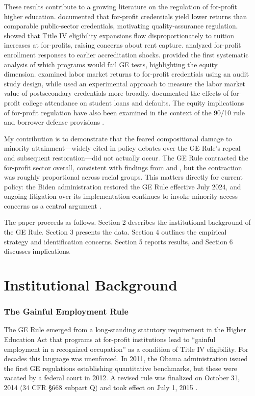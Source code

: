 \documentclass[12pt]{article}
\begin{document}
These results contribute to a growing literature on the regulation of for-profit higher education. \citet{DemingGoldinKatz2012} documented that for-profit credentials yield lower returns than comparable public-sector credentials, motivating quality-assurance regulation. \citet{CelliniTurner2019} showed that Title IV eligibility expansions flow disproportionately to tuition increases at for-profits, raising concerns about rent capture. \citet{Cellini2020} analyzed for-profit enrollment responses to earlier accreditation shocks. \citet{Kelchen2017} provided the first systematic analysis of which programs would fail GE tests, highlighting the equity dimension. \citet{Darolia2020} examined labor market returns to for-profit credentials using an audit study design, while \citet{DemingYusman2020} used an experimental approach to measure the labor market value of postsecondary credentials more broadly. \citet{ArcherHutchens2020} documented the effects of for-profit college attendance on student loans and defaults. The equity implications of for-profit regulation have also been examined in the context of the 90/10 rule \citep{CelliniKoester2023} and borrower defense provisions \citep{LooneyYannelis2022}.

My contribution is to demonstrate that the feared compositional damage to minority attainment---widely cited in policy debates over the GE Rule's repeal and subsequent restoration---did not actually occur. The GE Rule contracted the for-profit sector overall, consistent with findings from \citet{Kelchen2017} and \citet{BirdMacPhee2020}, but the contraction was roughly proportional across racial groups. This matters directly for current policy: the Biden administration restored the GE Rule effective July 2024, and ongoing litigation over its implementation continues to invoke minority-access concerns as a central argument \citep{TICAS2023}.

The paper proceeds as follows. Section 2 describes the institutional background of the GE Rule. Section 3 presents the data. Section 4 outlines the empirical strategy and identification concerns. Section 5 reports results, and Section 6 discusses implications.


\section{Institutional Background}

\subsubsection*{The Gainful Employment Rule} The GE Rule emerged from a long-standing statutory requirement in the Higher Education Act that programs at for-profit institutions lead to ``gainful employment in a recognized occupation'' as a condition of Title IV eligibility. For decades this language was unenforced. In 2011, the Obama administration issued the first GE regulations establishing quantitative benchmarks, but these were vacated by a federal court in 2012. A revised rule was finalized on October 31, 2014 (34 CFR \S668 subpart Q) and took effect on July 1, 2015 \citep{FederalRegister2014}.
\end{document}
